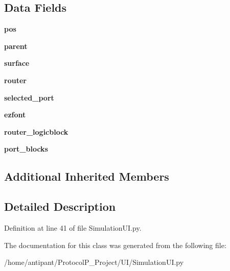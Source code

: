 \subsection*{Data Fields}
\begin{DoxyCompactItemize}
\item 
\hypertarget{classSimulationUI_1_1RouterModel_a1d3617a602c08ed680127cc257e97b87}{{\bfseries pos}}\label{classSimulationUI_1_1RouterModel_a1d3617a602c08ed680127cc257e97b87}

\item 
\hypertarget{classSimulationUI_1_1RouterModel_a8bf99e117068fbbff2d23bf9ba80a1b4}{{\bfseries parent}}\label{classSimulationUI_1_1RouterModel_a8bf99e117068fbbff2d23bf9ba80a1b4}

\item 
\hypertarget{classSimulationUI_1_1RouterModel_a6b17eb9939b93425c8f966deab59f347}{{\bfseries surface}}\label{classSimulationUI_1_1RouterModel_a6b17eb9939b93425c8f966deab59f347}

\item 
\hypertarget{classSimulationUI_1_1RouterModel_acf42147c3c9b5d79cc1b109e8d414852}{{\bfseries router}}\label{classSimulationUI_1_1RouterModel_acf42147c3c9b5d79cc1b109e8d414852}

\item 
\hypertarget{classSimulationUI_1_1RouterModel_aaa43fd3c59476472e46c55325a3feb5c}{{\bfseries selected\-\_\-port}}\label{classSimulationUI_1_1RouterModel_aaa43fd3c59476472e46c55325a3feb5c}

\item 
\hypertarget{classSimulationUI_1_1RouterModel_a9603150ce3eb99c674a396943a9ca7f0}{{\bfseries ezfont}}\label{classSimulationUI_1_1RouterModel_a9603150ce3eb99c674a396943a9ca7f0}

\item 
\hypertarget{classSimulationUI_1_1RouterModel_a39d6a3c8dd0f87d62f2850b99469929c}{{\bfseries router\-\_\-logicblock}}\label{classSimulationUI_1_1RouterModel_a39d6a3c8dd0f87d62f2850b99469929c}

\item 
\hypertarget{classSimulationUI_1_1RouterModel_a5cdecd2aad348c9aaf36e4f0ce350beb}{{\bfseries port\-\_\-blocks}}\label{classSimulationUI_1_1RouterModel_a5cdecd2aad348c9aaf36e4f0ce350beb}

\end{DoxyCompactItemize}
\subsection*{Additional Inherited Members}


\subsection{Detailed Description}


Definition at line 41 of file Simulation\-U\-I.\-py.



The documentation for this class was generated from the following file\-:\begin{DoxyCompactItemize}
\item 
/home/antipant/\-Protocol\-P\-\_\-\-Project/\-U\-I/Simulation\-U\-I.\-py\end{DoxyCompactItemize}
